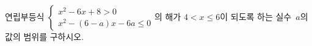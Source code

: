 연립부등식 $\begin{cases} x^2-6x+8>0 \\ x^2-(6-a)x-6a\le 0 \end{cases}$의 해가 $4<x\le 6$이 되도록 하는 실수~$a$의 값의 범위를 구하시오.
